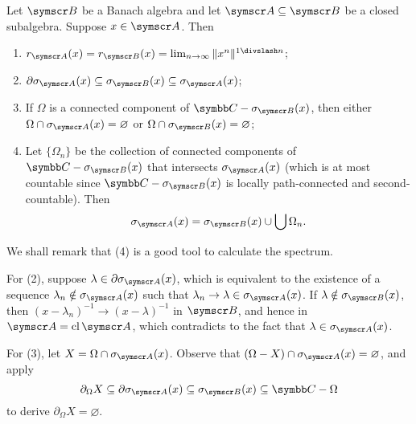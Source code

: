 \begin{proposition}
  Let $\BA B$ be a Banach algebra and let $\BA A\subseteq \BA B$ be a closed subalgebra. Suppose $x\in\BA A$. Then
  \begin{enumerate}
    \item $r_{\BA A}(x) = r_{\BA B}(x) = \lim_{n\to\infty}\NORM{x^n}^{1\DIV n}$;
    \item $\partial\sigma_{\BA A}(x)\subseteq\sigma_{\BA B}(x)\subseteq \sigma_{\BA A}(x)$;
    \item If $\Omega$ is a connected component of $\CC - \sigma_{\BA B}(x)$, then either $\Omega\cap \sigma_{\BA A}(x)=\varnothing$ or $\Omega\cap \sigma_{\BA B}(x)=\varnothing$;
    \item Let $\{\Omega_n\}$ be the collection of connected components of $\CC - \sigma_{\BA B}(x)$ that intersects $\sigma_{\BA A}(x)$ (which is at most countable since $\CC - \sigma_{\BA B}(x)$ is locally path-connected and second-countable). Then
    \begin{equation}
      \sigma_{\BA A}(x)=\sigma_{\BA B}(x)\cup\bigcup \Omega_n.
    \end{equation}
  \end{enumerate}
\end{proposition}

We shall remark that (4) is a good tool to calculate the spectrum.

\begin{hint}
  For (2), suppose $\lambda\in\partial\sigma_{\BA A}(x)$, which is equivalent to the existence of a sequence $\lambda_n\notin \sigma_{\BA A}(x)$ such that $\lambda_n\to \lambda\in \sigma_{\BA A}(x)$. If $\lambda\notin \sigma_{\BA B}(x)$, then $(x-\lambda_n)^{-1}\to (x-\lambda)^{-1}$ in $\BA B$, and hence in $\BA A = \CL \BA A$, which contradicts to the fact that $\lambda\in\sigma_{\BA A}(x)$.

  For (3), let $X = \Omega\cap \sigma_{\BA A}(x)$. Observe that $(\Omega-X)\cap \sigma_{\BA A}(x)=\varnothing$, and apply
  \begin{equation*}
    \partial_\Omega X\subseteq\partial\sigma_{\BA A}(x)\subseteq\sigma_{\BA B}(x)\subseteq \CC-\Omega
  \end{equation*}
  to derive $\partial_\Omega X = \varnothing$.
\end{hint}

